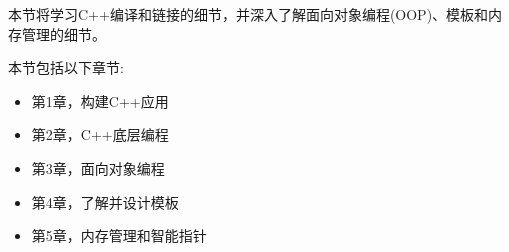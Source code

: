 本节将学习C++编译和链接的细节，并深入了解面向对象编程(OOP)、模板和内存管理的细节。 \par

本节包括以下章节: \par

\begin{itemize}
	\item 第1章，构建C++应用
	\item 第2章，C++底层编程
	\item 第3章，面向对象编程
	\item 第4章，了解并设计模板
	\item 第5章，内存管理和智能指针
\end{itemize}

\newpage